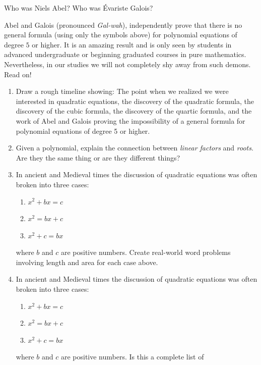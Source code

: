 \begin{question} 
Who was Niels Abel? Who was \'{E}variste
Galois?
\end{question}
\QM

Abel and Galois (pronounced \textit{Gal-wah}), independently prove
that there is no general formula (using only the symbols above) for
polynomial equations of degree $5$ or higher. It is an amazing result
and is only seen by students in advanced undergraduate or beginning
graduated courses in pure mathematics. Nevertheless, in our studies we
will not completely shy away from such demons. Read on!






\newpage

\begin{problems}
\begin{enumerate}
\item Draw a rough timeline showing: The point when we realized we
  were interested in quadratic equations, the discovery of the
  quadratic formula, the discovery of the cubic formula, the discovery
  of the quartic formula, and the work of Abel and Galois proving the
  impossibility of a general formula for polynomial equations of
  degree 5 or higher.
\item Given a polynomial, explain the connection between
  \textit{linear factors} and \textit{roots}. Are they the same thing
  or are they different things?
\item In ancient and Medieval times the discussion of quadratic
  equations was often broken into three cases:
\begin{enumerate}
\item $x^2 + bx = c$
\item $x^2 = bx + c$
\item $x^2 + c = bx$
\end{enumerate}
where $b$ and $c$ are positive numbers. Create real-world word
problems involving length and area for each case above.
\item In ancient and Medieval times the discussion of quadratic
  equations was often broken into three cases:
\begin{enumerate}
\item $x^2 + bx = c$
\item $x^2 = bx + c$
\item $x^2 + c = bx$
\end{enumerate}
where $b$ and $c$ are positive numbers.  Is this a complete list of

\end{enumerate}
\end{problems}
